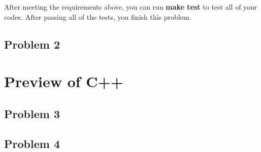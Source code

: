 \documentclass{report}
\begin{document}
After meeting the requirements above, you can run \textbf{make test} to test all of
your codes. After passing all of the tests, you finish this problem.

\section{Problem 2}

\chapter{Preview of C++}

\section{Problem 3}

\section{Problem 4}
\end{document}
